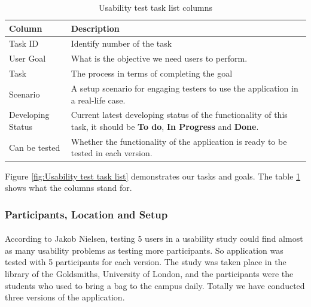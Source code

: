 \documentclass[12pt,a4paper]{article}
\begin{document}
            \begin{table}[H]
              \centering
                \begin{tabularx}{\textwidth}{l X}
                  \hline
                  Column & Description  \\ \hline
                  Task ID & Identify number of the task  \\ 
                  User Goal & What is the objective we need users to perform.  \\ 
                  Task & The process in terms of completing the goal  \\ 
                  Scenario & A setup scenario for engaging testers to use the application in a real-life case.   \\ 
                  Developing Status & Current latest developing status of the functionality of this task, it should be {\bf To do}, {\bf In Progress} and {\bf Done}.\\ 
                  Can be tested &  Whether the functionality of the application is ready to be tested in each version.\\ 
                  \hline
                \end{tabularx}
                \caption[Table caption text]{Usability test task list columns}
                \label{table:Usability test task list columns}
            \end{table}

            Figure \ref{fig:Usability test task list} demonstrates our tasks and goals. The table \ref{table:Usability test task list columns} shows what the columns stand for.

        \subsubsection{Participants, Location and Setup}
          \paragraph{} According to Jakob Nielsen, testing 5 users in a usability study could find almost as many usability problems as testing more participants\cite{HowManyTestUsers}. So application was tested with 5 participants for each version. The study was taken place in the library of the Goldsmiths, University of London, and the participants were the students who used to bring a bag to the campus daily. Totally we have conducted three versions of the application.
          
\end{document}
